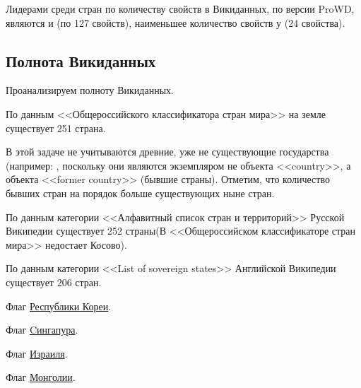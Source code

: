 Лидерами среди стран по количеству свойств в Викиданных, по версии ProWD, являются  и  (по 127 свойств), наименьшее количество свойств у  (24 свойства).


\subsection{Полнота Викиданных}

Проанализируем полноту Викиданных.

По данным <<Общероссийского классификатора стран мира>> на земле существует 251 страна\cite{country_1}.

В этой задаче не учитываются древние, уже не существующие государства (например: , поскольку они являются экземпляром не объекта <<country>>, а объекта <<former country>> (бывшие страны). Отметим, что количество бывших стран на порядок больше существующих ныне стран.

По данным категории <<Алфавитный список стран и территорий>> Русской Википедии существует 252 страны(В <<Общероссийском классификаторе стран мира>> недостает Косово).

По данным категории <<List of sovereign states>> Английской Википедии существует 206 стран.

\begin{marginfigure}[0.0cm]
	{
		\setlength{\fboxsep}{0pt}%
		\setlength{\fboxrule}{1pt}%
	}
	\caption{Флаг \href{https://w.wiki/mzc}{Республики Кореи}.}%
	\label{fig:flag_kor}%
\end{marginfigure}
\begin{marginfigure}[0.0cm]
	{
		\setlength{\fboxsep}{0pt}%
		\setlength{\fboxrule}{1pt}%
	}
	\caption{Флаг \href{https://w.wiki/mzd}{Cингапура}.}%
	\label{fig:flag_singapore}%
\end{marginfigure}
\begin{marginfigure}[0.0cm]
	{
		\setlength{\fboxsep}{0pt}%
		\setlength{\fboxrule}{1pt}%
	}
	\caption{Флаг \href{https://w.wiki/mzh}{Израиля}.}%
	\label{fig:flag_israel}%
\end{marginfigure}
\begin{marginfigure}[0.0cm]
	{
		\setlength{\fboxsep}{0pt}%
		\setlength{\fboxrule}{1pt}%
	}
	\caption{Флаг \href{https://w.wiki/mze}{Монголии}.}%
	\label{fig:flag_mongolia}%
\end{marginfigure}

